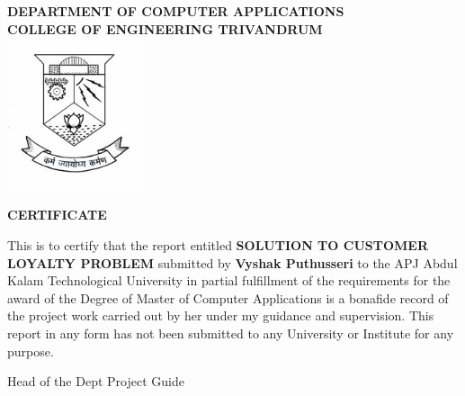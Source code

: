 \begin{titlepage}
\begin{center}

\textbf{DEPARTMENT OF COMPUTER APPLICATIONS}\\[0.5cm]
\textbf{ COLLEGE OF ENGINEERING TRIVANDRUM}\\
[0.5cm]

\vspace{1.2cm}
\includegraphics[width=0.30\textwidth]{2.jpg}\\
\vspace{0.8cm}

\large\textbf{CERTIFICATE}\\
\end{center}

This is to certify that the report entitled 
\textbf{SOLUTION TO CUSTOMER LOYALTY PROBLEM} submitted by
\textbf{Vyshak Puthusseri} to the APJ Abdul Kalam Technological University in partial
fulfillment of the requirements for the award of the Degree of Master of
Computer Applications is a bonafide record of the project work carried out by
her under my guidance and supervision. This report in any form has not been
submitted to any University or Institute for any purpose.

\vspace{4 cm}

\noindent Head of the Dept
\hfill Project Guide
\\ \\\\


\end{titlepage}
